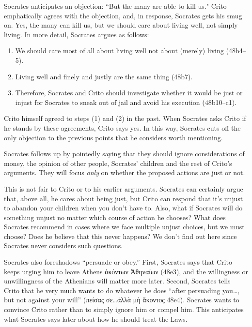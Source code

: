 \documentclass[12pt,letterpaper]{article}
\begin{document}
Socrates anticipates an objection: ``But the many are able to kill us." Crito emphatically agrees with the objection, and, in response, Socrates gets his smug on. Yes, the many can kill us, but we should care about living well, not simply living. In more detail, Socrates argues as follows:

\begin{enumerate}
    \item We should care most of all about living well not about (merely) living (48b4--5).
    \item Living well and finely and justly are the same thing (48b7).
    \item Therefore, Socrates and Crito should investigate whether it would be just or injust for Socrates to sneak out of jail and avoid his execution (48b10--c1).
\end{enumerate}

Crito himself agreed to steps (1) and (2) in the past. When Socrates asks Crito if he stands by these agreements, Crito says yes. In this way, Socrates cuts off the only objection to the previous points that he considers worth mentioning.

Socrates follows up by pointedly saying that they should ignore considerations of money, the opinion of other people, Socrates' children and the rest of Crito's arguments. They will focus \emph{only} on whether the proposed actions are just or not.

This is not fair to Crito or to his earlier arguments. Socrates can certainly argue that, above all, he cares about being just, but Crito can respond that it's unjust to abandon your children when you don't have to. Also, what if Socrates will do something unjust no matter which course of action he chooses? What does Socrates recommend in cases where we face multiple unjust choices, but we must choose? Does he believe that this never happens? We don't find out here since Socrates never considers such questions.

Socrates also foreshadows ``persuade or obey.'' First, Socrates says that Crito keeps urging him to leave Athens \textgreek{ἀκόντων Ἀθηναίων} (48e3), and the willingness or unwillingness of the Athenians will matter more later. Second, Socrates tells Crito that he very much wants to do whatever he does ``after persuading you\dots, but not against your will'' (\textgreek{πείσας σε}\dots\textgreek{ἀλλὰ μὴ ἄκοντος} 48e4). Socrates wants to convince Crito rather than to simply ignore him or compel him. This anticipates what Socrates says later about how he should treat the Laws.
\end{document}
